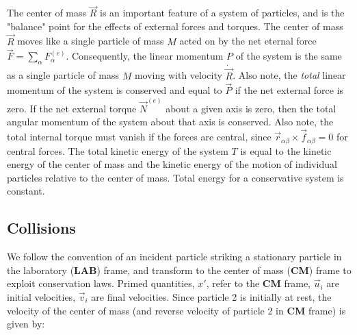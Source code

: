The center of mass $\vec{R}$ is an important feature of a system of particles, and is the "balance" point for the effects of external forces and torques. 
The center of mass $\vec{R}$ moves like a single particle of mass $M$ acted on by the net eternal force $\vec{F}=\sum_{\alpha}F_{\alpha}^{(e)}$. Consequently, the linear momentum $P$ of the system is the same as a single particle of mass $M$ moving with velocity $\dot{\vec{R}}$. Also note, the \textit{total} linear momentum of the system is conserved and equal to $\vec{P}$ if the net external force is zero.
If the net external torque $\vec{N}^{(e)}$ about a given axis is zero, then the total angular momentum of the system about that axis is conserved. Also note, the total internal torque must vanish if the forces are central, since $\vec{r}_{\alpha\beta}\times \vec{f}_{\alpha\beta} = 0$ for central forces.
The total kinetic energy of the system $T$ is equal to the kinetic energy of the center of mass and the kinetic energy of the motion of individual particles relative to the center of mass. Total energy for a conservative system is constant.

\subsection{Collisions}
We follow the convention of an incident particle striking a stationary particle in the laboratory (\textbf{LAB}) frame, and transform to the center of mass (\textbf{CM}) frame to exploit conservation laws. Primed quantities, $x'$, refer to the \textbf{CM} frame, $\vec{u}_i$ are initial velocities, $\vec{v}_i$ are final velocities. Since particle 2 is initially at rest, the velocity of the center of mass (and reverse velocity of particle 2 in \textbf{CM} frame) is given by:

